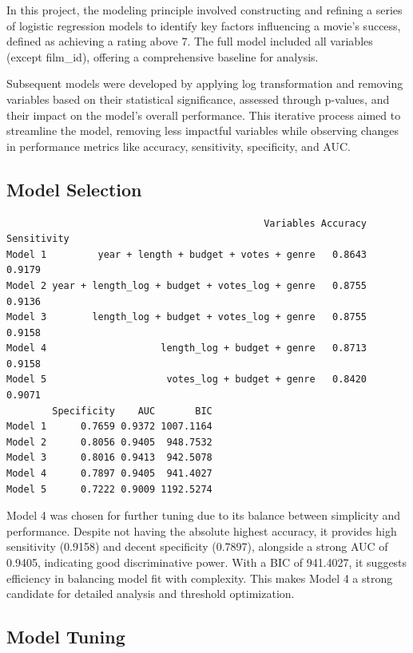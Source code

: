 \documentclass[
  11pt,
]{article}
\begin{document}
In this project, the modeling principle involved constructing and
refining a series of logistic regression models to identify key factors
influencing a movie's success, defined as achieving a rating above 7.
The full model included all variables (except film\_id), offering a
comprehensive baseline for analysis.

Subsequent models were developed by applying log transformation and
removing variables based on their statistical significance, assessed
through p-values, and their impact on the model's overall performance.
This iterative process aimed to streamline the model, removing less
impactful variables while observing changes in performance metrics like
accuracy, sensitivity, specificity, and AUC.

\hypertarget{model-selection}{%
\subsection{Model Selection}\label{model-selection}}

\begin{verbatim}
                                             Variables Accuracy Sensitivity
Model 1         year + length + budget + votes + genre   0.8643      0.9179
Model 2 year + length_log + budget + votes_log + genre   0.8755      0.9136
Model 3        length_log + budget + votes_log + genre   0.8755      0.9158
Model 4                    length_log + budget + genre   0.8713      0.9158
Model 5                     votes_log + budget + genre   0.8420      0.9071
        Specificity    AUC       BIC
Model 1      0.7659 0.9372 1007.1164
Model 2      0.8056 0.9405  948.7532
Model 3      0.8016 0.9413  942.5078
Model 4      0.7897 0.9405  941.4027
Model 5      0.7222 0.9009 1192.5274
\end{verbatim}

Model 4 was chosen for further tuning due to its balance between
simplicity and performance. Despite not having the absolute highest
accuracy, it provides high sensitivity (0.9158) and decent specificity
(0.7897), alongside a strong AUC of 0.9405, indicating good
discriminative power. With a BIC of 941.4027, it suggests efficiency in
balancing model fit with complexity. This makes Model 4 a strong
candidate for detailed analysis and threshold optimization.

\hypertarget{model-tuning}{%
\subsection{Model Tuning}\label{model-tuning}}
\end{document}
